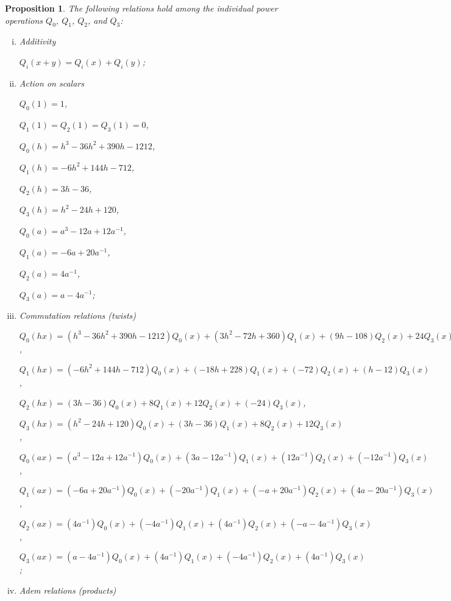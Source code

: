\documentclass{gtpart}
\newtheorem{prop}[thm]{Proposition}
\theoremstyle{definition}
\theoremstyle{remark}
\begin{document}
\begin{prop}
\label{prop:Gamma}
 The following relations hold among the individual power operations $Q_0$, $Q_1$, $Q_2$, and $Q_3$: 
 \begin{enumerate}[(i)]
  \item Additivity 

  $Q_i(x+y) = Q_i(x) + Q_i(y)$; 

  \item Action on scalars 
  
  $Q_0(1) = 1$, 

  $Q_1(1) = Q_2(1) = Q_3(1) = 0$, 

  $Q_0(h) = h^3 - 36 h^2 + 390 h - 1212$, 

  $Q_1(h) = -6 h^2 + 144 h - 712$, 

  $Q_2(h) = 3 h - 36$, 

  $Q_3(h) = h^2 - 24 h + 120$, 

  $Q_0(a) = a^3 - 12 a + 12 a^{-1}$, 

  $Q_1(a) = -6 a + 20 a^{-1}$, 

  $Q_2(a) = 4 a^{-1}$, 

  $Q_3(a) = a - 4 a^{-1}$; 

  \item Commutation relations (twists) 

  $Q_0(h x) = (h^3 - 36 h^2 + 390 h - 1212) Q_0(x) + (3 h^2 - 72 h + 360) Q_1(x) + (9 h - 108) Q_2(x) + 24 Q_3(x)$, 

  $Q_1(h x) = (-6 h^2 + 144 h - 712) Q_0(x) + (-18 h + 228) Q_1(x) + (-72) Q_2(x) + (h - 12) Q_3(x)$, 

  $Q_2(h x) = (3 h - 36) Q_0(x) + 8 Q_1(x) + 12 Q_2(x) + (-24) Q_3(x)$, 

  $Q_3(h x) = (h^2 - 24 h + 120) Q_0(x) + (3 h - 36) Q_1(x) + 8 Q_2(x) + 12 Q_3(x)$, 

  $Q_0(a x) = (a^3 - 12 a + 12 a^{-1}) Q_0(x) + (3 a - 12 a^{-1}) Q_1(x) + (12 a^{-1}) Q_2(x) + (-12 a^{-1}) Q_3(x)$, 

  $Q_1(a x) = (-6 a + 20 a^{-1}) Q_0(x) + (-20 a^{-1}) Q_1(x) + (- a + 20 a^{-1}) Q_2(x) + (4 a - 20 a^{-1}) Q_3(x)$, 

  $Q_2(a x) = (4 a^{-1}) Q_0(x) + (-4 a^{-1}) Q_1(x) + (4 a^{-1}) Q_2(x) + (- a - 4 a^{-1}) Q_3(x)$, 

  $Q_3(a x) = (a - 4 a^{-1}) Q_0(x) + (4 a^{-1}) Q_1(x) + (-4 a^{-1}) Q_2(x) + (4 a^{-1}) Q_3(x)$; 

  \item Adem relations (products) 


\end{enumerate}
\end{prop}
\end{document}
